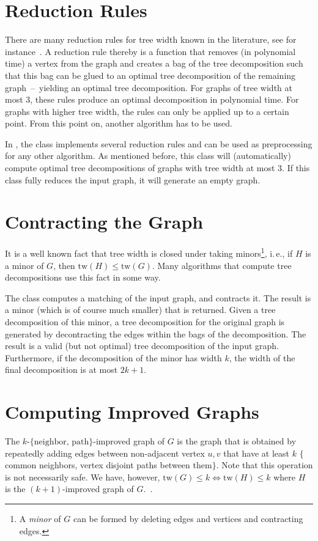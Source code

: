 \documentclass[a4paper, ukenglish, twoside, openright]{jdrasilmanual}
\begin{document}
\section{Reduction Rules}
There are many reduction rules for tree width known in the
literature, see for instance~\cite{DowneyF2013}. A reduction rule thereby is a function that removes (in
polynomial time) a vertex from the graph and creates a bag of the
tree decomposition such that this bag can be glued to an optimal
tree decomposition of the remaining graph~–~yielding  an optimal
tree decomposition. For graphs of tree width at most 3, these rules
produce an optimal decomposition in polynomial time.  For graphs with
higher tree width, the rules can only be applied up to a certain
point. From this point on, another algorithm has to be used.

In \Jdrasil, the class  implements several
reduction rules and can be used as preprocessing for any other
algorithm. As mentioned before, this class will (automatically)
compute optimal tree decompositions of graphs with tree width at most
$3$. If this class fully reduces the input graph, it will generate an
empty graph.

\section{Contracting the Graph}
It is a well known fact that tree width is closed under taking
minors\footnote{A \emph{minor} of $G$ can be formed by deleting edges
  and vertices and contracting edges.},
i.\,e., if \(H\) is a minor of \(G\), then \(\mathrm{tw}(H)\leq
\mathrm{tw}(G)\). Many algorithms that compute tree decompositions use
this fact in some way.
  
The  class computes a matching of the input graph, and
contracts it. The result is a minor (which is of course much smaller)
that is returned. Given a tree decomposition of this minor, a tree
decomposition for the original graph is generated by decontracting the
edges within the bags of the decomposition. The result is a valid (but
not optimal) tree decomposition of the input graph. Furthermore, if
the decomposition of the minor has width \(k\), the width of the final
decomposition is at most \(2k+1\).
  
\section{Computing Improved Graphs}
The $k$-$\{\text{neighbor, path}\}$-improved graph of $G$ is the graph
that is obtained by repeatedly adding edges between non-adjacent
vertex $u,v$ that have at least $k$ $\{$common neighbors, vertex
disjoint paths between them$\}$. Note that this operation is not
necessarily safe. We have, however, \(\mathrm{tw}(G)\leq
k\Leftrightarrow\mathrm{tw}(H)\leq k\) where \(H\) is the
\((k+1)\)-improved graph of \(G\).~\cite{bodleanderK2011}.
\end{document}
